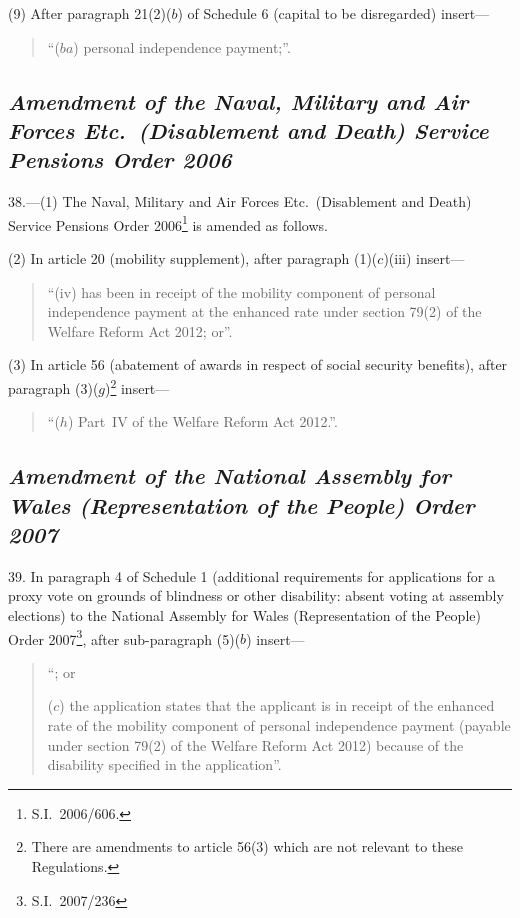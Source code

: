 \documentclass[12pt,a4paper]{article}
\begin{document}
(9) After paragraph 21(2)($b$)  of Schedule 6 (capital to be disregarded) insert—
\begin{quotation}
“($ba$) personal independence payment;”.
\end{quotation}

\subsection*{\itshape Amendment of the Naval, Military and Air Forces Etc.\ (Disablement and Death) Service Pensions Order 2006}

38.—(1) The Naval, Military and Air Forces Etc.\ (Disablement and Death) Service Pensions Order 2006\footnote{S.I.~2006/606.} is amended as follows.

(2) In article 20 (mobility supplement), after paragraph (1)($c$)(iii)  insert—
\begin{quotation}
“(iv) has been in receipt of the mobility component of personal independence payment at the enhanced rate under section 79(2) of the Welfare Reform Act 2012; or”.
\end{quotation}

(3) In article 56 (abatement of awards in respect of social security benefits), after paragraph (3)($g$)\footnote{There are amendments to article 56(3) which are not relevant to these Regulations.} insert—
\begin{quotation}
“($h$) Part~IV of the Welfare Reform Act 2012.”.
\end{quotation}

\subsection*{\itshape Amendment of the National Assembly for Wales (Representation of the People) Order 2007}

39.  In paragraph 4 of Schedule 1 (additional requirements for applications for a proxy vote on grounds of blindness or other disability: absent voting at assembly elections) to the National Assembly for Wales (Representation of the People) Order 2007\footnote{S.I.~2007/236}, after sub-paragraph (5)($b$)  insert—
\begin{quotation}
“; or

($c$) the application states that the applicant is in receipt of the enhanced rate of the mobility component of personal independence payment (payable under section 79(2) of the Welfare Reform Act 2012) because of the disability specified in the application”.
\end{quotation}
\end{document}
